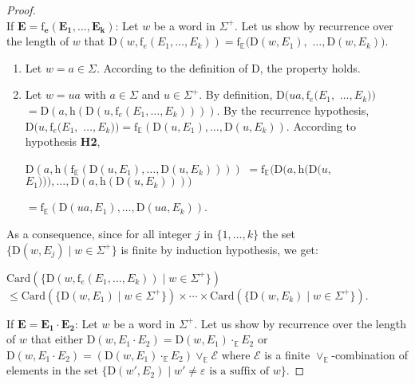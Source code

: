 \documentclass{article}
\begin{document}
\begin{proof}
\ \\
        
        
        
        
    If $\mathbf{E=\mathrm{f}_e(E_1,\ldots,E_k)}$:      
        Let $w$ be a word in $\Sigma^{+}$.
         Let us show by recurrence over the length of $w$ that $\mathrm{D}(w,\mathrm{f}_e(E_1,\ldots,E_k))=\mathrm{f}_{\mathbb{E}}(\mathrm{D}(w,E_1),$ $\ldots,\mathrm{D}(w,E_k))$.
          
          \begin{enumerate}
            \item Let $w=a\in\Sigma$. According to the definition of $\mathrm{D}$, the property holds.
            \item Let $w=ua$ with $a\in\Sigma$ and $u\in\Sigma^{+}$. By definition, $\mathrm{D}(ua,\mathrm{f}_e(E_1,$ $\ldots,E_k))$ $=\mathrm{D}(a,\mathrm{h}(\mathrm{D}(u,\mathrm{f}_e(E_1,\ldots,E_k))))$. By the recurrence hypothesis, $\mathrm{D}(u,\mathrm{f}_e(E_1,$ $\ldots,E_k))=\mathrm{f}_{\mathbb{E}}(\mathrm{D}(u,E_1),\ldots,\mathrm{D}(u,E_k))$. According to hypothesis \textbf{H2},
            
            \centerline{ $\mathrm{D}(a,\mathrm{h}(\mathrm{f}_{\mathbb{E}}(\mathrm{D}(u,E_1),\ldots,\mathrm{D}(u,E_k))))$ $=\mathrm{f}_{\mathbb{E}}(\mathrm{D}(a,\mathrm{h}(\mathrm{D}(u,$ $E_1))),\ldots,\mathrm{D}(a,\mathrm{h}(\mathrm{D}(u,E_k))))$}
            
            \centerline{ $=\mathrm{f}_{\mathbb{E}}(\mathrm{D}(ua,E_1),\ldots,\mathrm{D}(ua,E_k))$.}
            
          \end{enumerate}  
          
         As a consequence, since for all integer $j$ in $\{1,\ldots,k\}$ the set $\{\mathrm{D}(w,E_j)\mid w\in\Sigma^{+}\}$ is finite by induction hypothesis, we get:
       \begin{center}
        $\mathrm{Card}(\{\mathrm{D}(w,\mathrm{f}_e(E_1,\ldots,E_k))\mid w\in\Sigma^{+}\})$\\
        $\leq
         \mathrm{Card}(\{\mathrm{D}(w,E_1)\mid w\in\Sigma^{+}\})\times \cdots \times \mathrm{Card}(\{\mathrm{D}(w,E_k)\mid w\in\Sigma^{+}\})$.
      \end{center}
    
    If $\mathbf{E=E_1\cdot E_2}$:
        Let $w$ be a word in $\Sigma^{+}$.
          Let us show by recurrence over the length of $w$ that either $\mathrm{D}(w,E_1\cdot E_2)=\mathrm{D}(w,E_1) \cdot_{\mathbb{E}} E_2 $ or $\mathrm{D}(w,E_1\cdot E_2)=(\mathrm{D}(w,E_1) \cdot_{\mathbb{E}} E_2) \vee_{\mathbb{E}} \mathcal{E}$ where $\mathcal{E}$ is a finite $\vee_{\mathbb{E}}$-combination of elements in the set $\{\mathrm{D}(w',E_2)\mid w'\neq\varepsilon \text{ is a suffix of }w\}$.
          

\end{proof}
\end{document}
